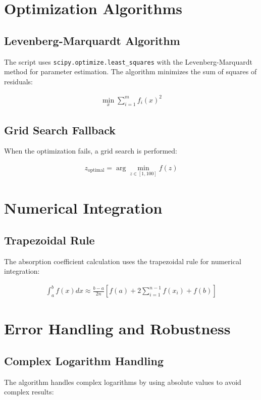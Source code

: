 \documentclass{article}
\begin{document}
\section{Optimization Algorithms}

\subsection{Levenberg-Marquardt Algorithm}
The script uses \texttt{scipy.optimize.least\_squares} with the Levenberg-Marquardt method for parameter estimation. The algorithm minimizes the sum of squares of residuals:

\begin{align}
\min_{x} \sum_{i=1}^{m} f_i(x)^2
\end{align}

\subsection{Grid Search Fallback}
When the optimization fails, a grid search is performed:

\begin{align}
z_{\text{optimal}} = \arg\min_{z \in [1, 100]} f(z)
\end{align}

\section{Numerical Integration}

\subsection{Trapezoidal Rule}
The absorption coefficient calculation uses the trapezoidal rule for numerical integration:

\begin{align}
\int_a^b f(x)dx \approx \frac{b-a}{2n}\left[f(a) + 2\sum_{i=1}^{n-1}f(x_i) + f(b)\right]
\end{align}

\section{Error Handling and Robustness}

\subsection{Complex Logarithm Handling}
The algorithm handles complex logarithms by using absolute values to avoid complex results:
\end{document}
